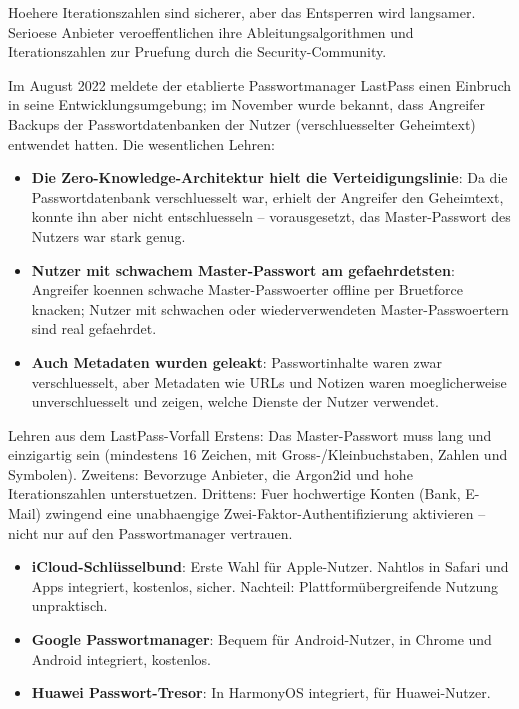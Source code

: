 Hoehere Iterationszahlen sind sicherer, aber das Entsperren wird langsamer. Serioese Anbieter veroeffentlichen ihre Ableitungsalgorithmen und Iterationszahlen zur Pruefung durch die Security-Community.


Im August 2022 meldete der etablierte Passwortmanager LastPass einen Einbruch in seine Entwicklungsumgebung; im November wurde bekannt, dass Angreifer Backups der Passwortdatenbanken der Nutzer (verschluesselter Geheimtext) entwendet hatten. Die wesentlichen Lehren:

\begin{itemize}
  \item \textbf{Die Zero-Knowledge-Architektur hielt die Verteidigungslinie}: Da die Passwortdatenbank verschluesselt war, erhielt der Angreifer den Geheimtext, konnte ihn aber nicht entschluesseln – vorausgesetzt, das Master-Passwort des Nutzers war stark genug.
  \item \textbf{Nutzer mit schwachem Master-Passwort am gefaehrdetsten}: Angreifer koennen schwache Master-Passwoerter offline per Bruetforce knacken; Nutzer mit schwachen oder wiederverwendeten Master-Passwoertern sind real gefaehrdet.
  \item \textbf{Auch Metadaten wurden geleakt}: Passwortinhalte waren zwar verschluesselt, aber Metadaten wie URLs und Notizen waren moeglicherweise unverschluesselt und zeigen, welche Dienste der Nutzer verwendet.
\end{itemize}

\begin{tcbwarn}{Lehren aus dem LastPass-Vorfall}
Erstens: Das Master-Passwort muss lang und einzigartig sein (mindestens 16 Zeichen, mit Gross-/Kleinbuchstaben, Zahlen und Symbolen). Zweitens: Bevorzuge Anbieter, die Argon2id und hohe Iterationszahlen unterstuetzen. Drittens: Fuer hochwertige Konten (Bank, E-Mail) zwingend eine unabhaengige Zwei-Faktor-Authentifizierung aktivieren – nicht nur auf den Passwortmanager vertrauen.

\end{tcbwarn}



\begin{itemize}
  \item \textbf{iCloud-Schlüsselbund}: Erste Wahl für Apple-Nutzer. Nahtlos in Safari und Apps integriert, kostenlos, sicher. Nachteil: Plattformübergreifende Nutzung unpraktisch.
  \item \textbf{Google Passwortmanager}: Bequem für Android-Nutzer, in Chrome und Android integriert, kostenlos.
  \item \textbf{Huawei Passwort-Tresor}: In HarmonyOS integriert, für Huawei-Nutzer.
\end{itemize}

